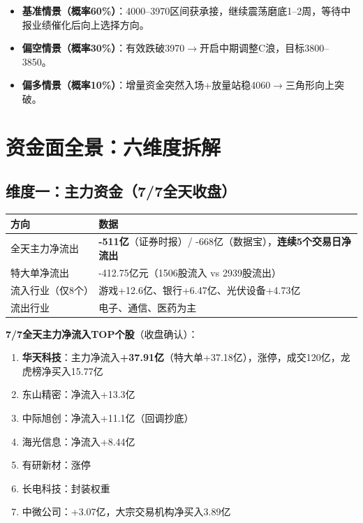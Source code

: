 \documentclass[a4paper,11pt,fontset=none]{ctexart}
\begin{document}
\begin{riskbox}[变盘方向判断]
\begin{itemize}
  \item \textbf{基准情景（概率60\%）}：4000--3970区间获承接，继续震荡磨底1--2周，等待中报业绩催化后向上选择方向。
  \item \textbf{偏空情景（概率30\%）}：有效跌破3970$\to$开启中期调整C浪，目标3800--3850。
  \item \textbf{偏多情景（概率10\%）}：增量资金突然入场+放量站稳4060$\to$三角形向上突破。
\end{itemize}
\end{riskbox}

\section{资金面全景：六维度拆解}

\subsection*{维度一：主力资金（7/7全天收盘）}

\begin{exhibitbox}
\begin{tabularx}{\textwidth}{L{3cm}X}
\toprule
\textbf{方向} & \textbf{数据} \\
\midrule
全天主力净流出 & \textbf{-511亿}（证券时报）/ -668亿（数据宝），\textbf{连续5个交易日净流出} \\
特大单净流出 & -412.75亿元（1506股流入 vs 2939股流出） \\
流入行业（仅8个） & 游戏+12.6亿、银行+6.47亿、光伏设备+4.73亿 \\
流出行业 & 电子、通信、医药为主 \\
\bottomrule
\end{tabularx}
\end{exhibitbox}

\textbf{7/7全天主力净流入TOP个股}（收盘确认）：
\begin{enumerate}
  \item \textbf{华天科技}：主力净流入\textbf{+37.91亿}（特大单+37.18亿），涨停，成交120亿，龙虎榜净买入15.77亿
  \item 东山精密：净流入+13.3亿
  \item 中际旭创：净流入+11.1亿（回调抄底）
  \item 海光信息：净流入+8.44亿
  \item 有研新材：涨停
  \item 长电科技：封装权重
  \item 中微公司：+3.07亿，大宗交易机构净买入3.89亿
\end{enumerate}
\end{document}
